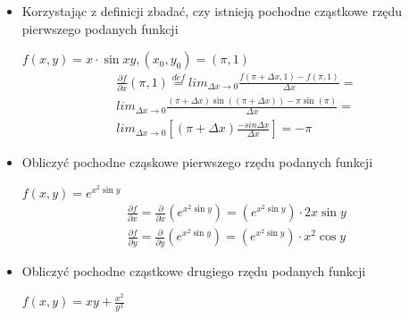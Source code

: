 \documentclass[12pt]{article}
\begin{document}
    \begin{itemize}
        \item  Korzystając z definicji zbadać, czy istnieją pochodne cząstkowe rzędu pierwszego podanych funkcji
    
        $f(x,y) = x \cdot \sin{xy}, (x_0, y_0) = (\pi,1)$\newline
        \newline
        \begin{equation}
        \begin{aligned}
        \frac{\partial f}{\partial x}(\pi, 1)  \stackrel{def}{=} lim_{\Delta x \rightarrow 0} \frac{f(\pi + \Delta x, 1) - f(\pi, 1)}{\Delta x} = \\
        lim_{\Delta x \rightarrow 0} \frac{(\pi + \Delta x ) \sin{((\pi + \Delta x))} - \pi \sin{(\pi)}}{\Delta x} = \\
        lim_{\Delta x \rightarrow 0} \left[ (\pi + \Delta x) \frac{-sin \Delta x}{\Delta x} \right] = - \pi
        \end{aligned}
        \end{equation}
        
        \item Obliczyć pochodne cząskowe pierwszego rzędu podanych funkcji
        
        $f(x,y) = e^{x^2 \sin y}$\newline
        \newline
        \begin{equation}
            \begin{aligned}
            \frac{\partial f}{\partial x} = \frac{\partial}{\partial x} \left( e^{x^2 \sin y} \right ) = \left( e^{x^2 \sin y} \right) \cdot 2x \sin y
            \end{aligned}
        \end{equation}
        \begin{equation}
            \begin{aligned}
            \frac{\partial f}{\partial y} = \frac{\partial}{\partial y} \left( e^{x^2 \sin y} \right ) = \left( e^{x^2 \sin y} \right) \cdot x^2 \cos y
            \end{aligned}
        \end{equation}
        
        \item Obliczyć pochodne cząstkowe drugiego rzędu podanych funkcji
        
        $f(x,y) = xy + \frac{x^2}{y^3}$
        

\end{itemize}
\end{document}
